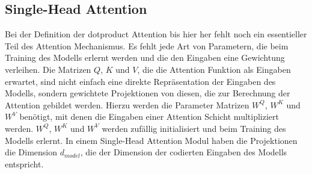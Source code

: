 \documentclass[conference]{IEEEtran}
\begin{document}
\subsection{Single-Head Attention}
Bei der Definition der dotproduct Attention bis hier her fehlt noch ein essentieller Teil des Attention Mechanismus. Es fehlt jede Art von Parametern, die beim Training des Modells erlernt werden und die den Eingaben eine Gewichtung verleihen. Die Matrizen $Q$, $K$ und $V$, die die Attention Funktion als Eingaben erwartet, sind nicht einfach eine direkte Repräsentation der Eingaben des Modells, sondern gewichtete Projektionen von diesen, die zur Berechnung der Attention gebildet werden. Hierzu werden die Parameter Matrizen $W^Q$, $W^K$ und $W^V$ benötigt, mit denen die Eingaben einer Attention Schicht multipliziert werden. $W^Q$, $W^K$ und $W^V$ werden zufällig initialisiert und beim Training des Modells erlernt. In einem Single-Head Attention Modul haben die Projektionen die Dimension $d_{model}$, die der Dimension der codierten Eingaben des Modells entspricht. \cite{attention_is_all_you_need}
\end{document}
